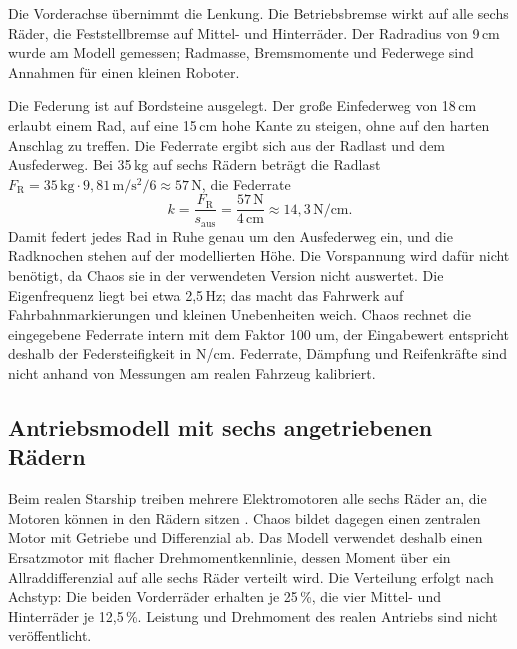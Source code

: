 Die Vorderachse übernimmt die Lenkung. Die Betriebsbremse wirkt auf alle sechs Räder, die
Feststellbremse auf Mittel- und Hinterräder. Der Radradius von 9\,cm wurde am Modell
gemessen; Radmasse, Bremsmomente und Federwege sind Annahmen für einen kleinen Roboter.

Die Federung ist auf Bordsteine ausgelegt. Der große Einfederweg von 18\,cm erlaubt
einem Rad, auf eine 15\,cm hohe Kante zu steigen, ohne auf den harten Anschlag zu treffen.
Die Federrate ergibt sich aus der Radlast und dem Ausfederweg. Bei 35\,kg auf sechs
Rädern beträgt die Radlast $F_\mathrm{R} = 35\,\mathrm{kg} \cdot 9{,}81\,\mathrm{m/s^2} / 6
\approx 57\,\mathrm{N}$, die Federrate
\begin{equation}
  k = \frac{F_\mathrm{R}}{s_\mathrm{aus}} = \frac{57\,\mathrm{N}}{4\,\mathrm{cm}}
  \approx 14{,}3\,\mathrm{N/cm}.
  \label{eq:starship_feder}
\end{equation}
Damit federt jedes Rad in Ruhe genau um den Ausfederweg ein, und die Radknochen stehen
auf der modellierten Höhe. Die Vorspannung wird dafür nicht benötigt, da Chaos sie in der
verwendeten Version nicht auswertet. Die Eigenfrequenz liegt bei etwa 2,5\,Hz; das macht
das Fahrwerk auf Fahrbahnmarkierungen und kleinen Unebenheiten weich. Chaos rechnet die
eingegebene Federrate intern mit dem Faktor 100 um, der Eingabewert entspricht deshalb
der Federsteifigkeit in N/cm. Federrate, Dämpfung und Reifenkräfte sind nicht anhand
von Messungen am realen Fahrzeug kalibriert.

\subsection{Antriebsmodell mit sechs angetriebenen Rädern}
\label{sec:starship_antrieb}

Beim realen Starship treiben mehrere Elektromotoren alle sechs Räder an, die Motoren
können in den Rädern sitzen \parencite{starship_patent_fahrwerk}. Chaos bildet dagegen
einen zentralen Motor mit Getriebe und Differenzial ab. Das Modell
verwendet deshalb einen Ersatzmotor mit flacher Drehmomentkennlinie, dessen Moment über
ein Allraddifferenzial auf alle sechs Räder verteilt wird. Die Verteilung erfolgt nach
Achstyp: Die beiden Vorderräder erhalten je 25\,\%, die vier Mittel- und Hinterräder je
12,5\,\%. Leistung und Drehmoment des realen Antriebs sind nicht veröffentlicht.

